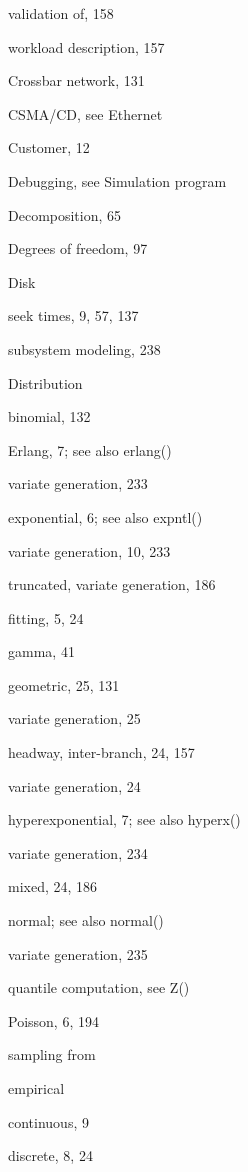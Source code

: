 \quad validation of, 158\par
\quad workload description, 157\par
\noindent Crossbar network, 131\par
\noindent CSMA/CD, see Ethernet\par
\noindent Customer, 12\par
\noindent Debugging, see Simulation program\par
\noindent Decomposition, 65\par
\noindent Degrees of freedom, 97\par
\noindent Disk\par
\quad seek times, 9, 57, 137\par
\quad subsystem modeling, 238\par
\noindent Distribution\par
\quad binomial, 132\par
\quad Erlang, 7; see also erlang()\par
\qquad variate generation, 233\par
\quad exponential, 6; see also expntl()\par
\qquad variate generation, 10, 233\par
\qquad truncated, variate generation, 186\par
\quad fitting, 5, 24\par
\quad gamma, 41\par
\quad geometric, 25, 131\par
\qquad variate generation, 25\par
\quad headway, inter-branch, 24, 157\par
\qquad variate generation, 24\par
\quad hyperexponential, 7; see also hyperx()\par
\qquad variate generation, 234\par
\quad mixed, 24, 186\par
\quad normal; see also normal()\par
\qquad variate generation, 235\par
\qquad quantile computation, see Z()\par
\quad Poisson, 6, 194\par
\quad sampling from\par
\qquad empirical\par
\qquad\quad continuous, 9\par
\qquad\quad discrete, 8, 24\par
